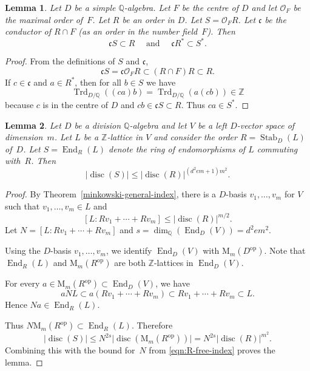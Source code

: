 \documentclass[JEP,XML,SOM,Unicode,NoFloatCountersInSection]{cedram}
\newcommand{\bQ}{\mathbb{Q}}
\newcommand{\bZ}{\mathbb{Z}}
\newcommand{\cO}{\mathcal{O}}
\newcommand{\fc}{\mathfrak{c}}
\newcommand{\rM}{\mathrm{M}}
\DeclareMathOperator{\disc}{disc}
\DeclareMathOperator{\End}{End}
\DeclareMathOperator{\Stab}{Stab}
\DeclareMathOperator{\Trd}{Trd}
\newcommand{\op}{\mathrm{op}}
\newcommand{\abs}[1]{\lvert #1 \rvert}
\newtheorem{lemma}{Lemma}[section]
\begin{document}
\begin{lemma} \label{conductor-S}
Let $D$ be a simple $\bQ$-algebra.
Let $F$ be the centre of $D$ and let $\cO_F$ be the maximal order of~$F$.
Let $R$ be an order in $D$.
Let $S = \cO_F R$.
Let $\fc$ be the conductor of $R \cap F$ (as an order in the number field~$F$).
Then
\[
\fc S \subset R \quad \text{ and } \quad \fc R^* \subset S^*.
\]
\end{lemma}

\begin{proof}
From the definitions of $S$ and $\fc$,
\[
\fc S = \fc \cO_F R \subset (R \cap F) R \subset R.
\]
If $c \in \fc$ and $a \in R^*$, then for all $b \in S$ we have
\[
\Trd_{D/\bQ}((ca)b) = \Trd_{D/\bQ}(a(cb)) \in \bZ
\]
because $c$ is in the centre of $D$ and $cb \in \fc S \subset R$.
Thus $ca \in S^*$.
\end{proof}

\begin{lemma} \label{disc-R-S}
Let $D$ be a division $\bQ$-algebra and let $V$ be a left $D$-vector space of dimension~$m$.
Let $L$ be a $\bZ$-lattice in $V$ and consider the order $R = \Stab_D(L)$ of~$D$.
Let $S = \End_R(L)$ denote the ring of endomorphisms of $L$ commuting with~$R$.
Then
\[
\abs{\disc(S)} \leq \abs{\disc(R)}^{(d^2em+1)m^2}.
\]
\end{lemma}

\begin{proof}
By Theorem~\ref{minkowski-general-index}, there
is a $D$-basis $v_1, \dotsc, v_m$ for $V$ such that \hbox{$v_1, \dotsc, v_m \!\in\! L$} and
\begin{equation} \label{eqn:R-free-index}
[L:Rv_1 + \dotsb + Rv_m] \leq \abs{\disc(R)}^{m/2}.
\end{equation}
Let $N = [L:Rv_1 + \dotsb + Rv_m]$ and $s = \dim_\bQ(\End_D(V)) = d^2em^2$.

Using the $D$-basis $v_1, \dotsc, v_m$, we identify $\End_D(V)$ with $\rM_m(D^\op)$.
Note that $\End_R(L)$ and $\rM_m(R^\op)$ are both $\bZ$-lattices in $\End_D(V)$.

For every $a \in \rM_m(R^\op) \subset \End_D(V)$, we have
\[
aNL \subset a(Rv_1 + \dotsb + Rv_m) \subset Rv_1 + \dotsb + Rv_m \subset L.
\]
Hence $Na \in \End_R(L)$.

Thus $N\rM_m(R^\op) \subset \End_R(L)$.
Therefore
\[
\abs{\disc(S)} \leq N^{2s} \abs{\disc(\rM_m(R^\op))}
= N^{2s} \abs{\disc(R)}^{m^2}.
\]
Combining this with the bound for~$N$ from \eqref{eqn:R-free-index} proves the lemma.
\end{proof}
\end{document}
